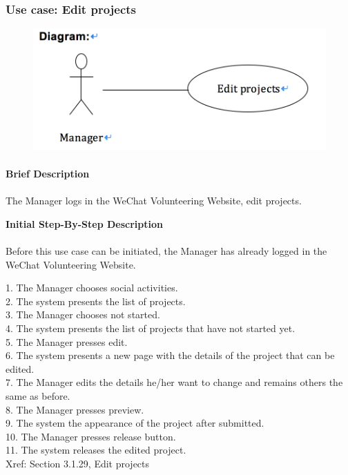 \documentclass[12pt]{report}
\begin{document}
\newpage
\subsubsection{Use case:  Edit projects }

\begin{figure}[!htb]
  \includegraphics{215.PNG}
\end{figure}
\paragraph{}
\begin{flushleft}
\textbf{Brief Description }
\paragraph{}
The Manager logs in the WeChat Volunteering Website, edit projects.\\

\begin{flushleft}
\textbf{Initial Step-By-Step Description }
\paragraph{}
Before this use case can be initiated, the Manager has already logged in the WeChat Volunteering Website.

\begin{flushleft}
1.	The Manager chooses social activities. \\
2.	The system presents the list of projects. \\
3.	The Manager chooses not started. \\
4.	The system presents the list of projects that have not started yet. \\
5.	The Manager presses edit. \\
6.	The system presents a new page with the details of the project that can be edited. \\
7.	The Manager edits the details he/her want to change and remains others the same as before. \\
8.	The Manager presses preview. \\
9.	The system the appearance of the project after submitted. \\
10.	The Manager presses release button. \\
11.	The system releases the edited project. \\
Xref: Section 3.1.29, Edit projects
\end{flushleft}
\end{flushleft}
\end{flushleft}
\end{document}
